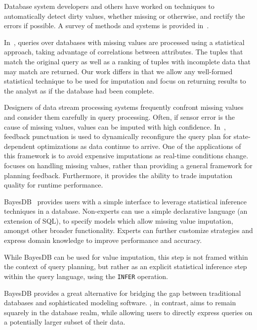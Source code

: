 Database system developers and others have worked on techniques to automatically
detect dirty values, whether missing or otherwise, and rectify the errors if
possible. A survey of methods and systems is provided in~\cite{hellerstein2008quantitative}.

In~\cite{wolf2007query}, queries over databases with missing values are
processed using a statistical approach, taking advantage of correlations between
attributes. The tuples that match the original query as well as a ranking of
tuples with incomplete data that may match are returned. Our work differs in
that we allow any well-formed statistical technique to be used for imputation
and focus on returning results to the analyst as if the database had been
complete.

Designers of data stream processing systems frequently confront missing values
and consider them carefully in query processing. Often, if sensor error is the
cause of missing values, values can be imputed with high confidence. In~\cite{fernandez2009inter}, feedback punctuation is used to dynamically
reconfigure the query plan for state-dependent
optimizations as data continue to arrive. One of the applications of this framework is to avoid
expensive imputations as real-time conditions change. 
\ProjectName{} focuses on handling
missing values, rather than providing a general framework for planning feedback. Furthermore,
it provides the ability
to trade imputation quality for runtime performance. 

BayesDB~\cite{mansinghka2015bayesdb} provides users with a simple interface to 
leverage statistical inference techniques in a database. Non-experts
can use a simple declarative language (an extension of SQL), to specify models
which allow missing value imputation, amongst other broader functionality.
Experts can further customize strategies and express domain knowledge to
improve performance and accuracy.

While BayesDB can be used for value imputation, this step is not framed
within the context of query planning, but rather as an explicit statistical
inference step within the query language, using the \verb|INFER| operation. 

BayesDB provides a great alternative for bridging the gap between
traditional databases and sophisticated modeling software. \ProjectName{}, in
contrast, aims to remain squarely in the database realm, while allowing
users to directly express queries on a potentially larger subset of their data.

